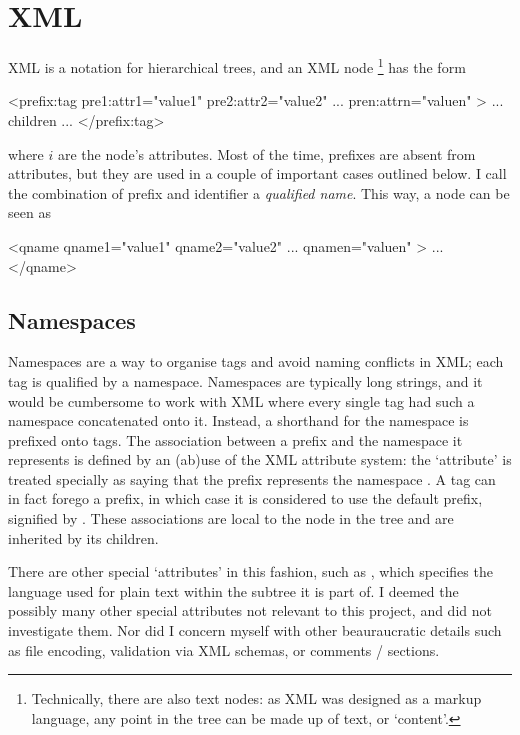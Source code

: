 \documentclass[12pt,a4paper,twoside,openright]{report}
\begin{document}
{\section{XML}
XML is a notation for hierarchical trees, and an XML node \footnote{Technically, there are also text nodes: as XML was designed as a markup language, any point in the tree can be made up of text, or `content'.} has the form
\begin{xml}
<prefix:tag pre1:attr1="value1" pre2:attr2="value2"
            ...
            pren:attrn="valuen" >
   ... children ...
</prefix:tag>
\end{xml}
where \(i\) are the node's attributes. Most of the time, prefixes are absent from attributes, but they are used in a couple of important cases outlined below. I call the combination of prefix and identifier a \emph{qualified name}. This way, a node can be seen as
\begin{xml}
<qname qname1="value1" qname2="value2" ... qnamen="valuen" >
  ...
</qname>
\end{xml}

\subsection{Namespaces}\label{sec:namespaces}
Namespaces are a way to organise tags and avoid naming conflicts in XML; each tag is qualified by a namespace. Namespaces are typically long strings, and it would be cumbersome to work with XML where every single tag had such a namespace concatenated onto it. Instead, a shorthand for the namespace is prefixed onto tags. The association between a prefix and the namespace it represents is defined by an (ab)use of the XML attribute system: the `attribute'  is treated specially as saying that the prefix  represents the namespace . A tag can in fact forego a prefix, in which case it is considered to use the default prefix, signified by . These associations are local to the node in the tree and are inherited by its children.

There are other special `attributes' in this fashion, such as , which specifies the language used for plain text within the subtree it is part of. I deemed the possibly many other special attributes not relevant to this project, and did not investigate them. Nor did I concern myself with other beauraucratic details such as file encoding, validation via XML schemas, or comments /  sections.

}
\end{document}
